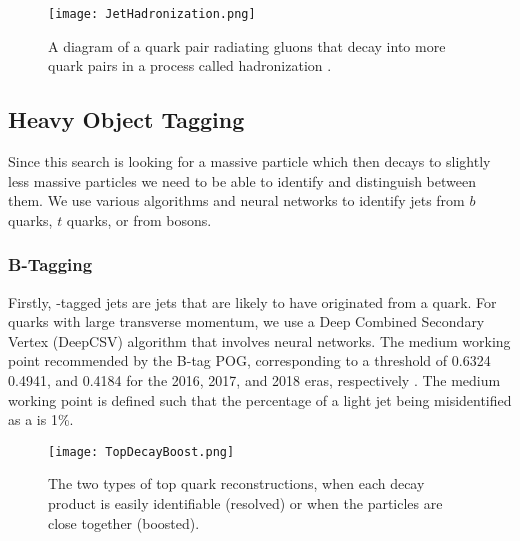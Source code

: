 \begin{figure}
 	\centering
	\texttt{[image: JetHadronization.png]}
 	\caption[Jet Hadronization]{A diagram of a quark pair radiating gluons that decay into more quark pairs in a process called hadronization \cite{griffiths_introduction_2008}.}
 	\label{JetHadronization} 
\end{figure}

\subsection{Heavy Object Tagging}\label{HeavyObject}
Since this search is looking for a massive particle which then decays to slightly less massive particles we need to be able to identify and distinguish between them. We use various algorithms and neural networks to identify jets from $b$ quarks, $t$ quarks, or from \W {} bosons. 

\subsubsection{B-Tagging}\label{Btagging}
Firstly, \B-tagged jets are jets that are likely to have originated from a \B{} quark. For \B{} quarks with large transverse momentum, we use a Deep Combined Secondary Vertex (DeepCSV) algorithm that involves neural networks\cite{noauthor_performance_nodate}. The medium working point recommended by the B-tag POG, corresponding to a threshold of 0.6324 0.4941, and 0.4184 for the 2016, 2017, and 2018 eras, respectively \cite{noauthor_https://twiki.cern.ch/twiki/bin/viewauth/cms/btagrecommendation2016legacy_nodate, noauthor_https://twiki.cern.ch/twiki/bin/viewauth/cms/btagrecommendation94x_nodate, noauthor_https://twiki.cern.ch/twiki/bin/viewauth/cms/btagrecommendation102x_nodate, noauthor_https://twiki.cern.ch/twiki/bin/viewauth/cms/btagsfmethods_nodate}. The medium working point is defined such that the percentage of a light jet being misidentified as a \bjet{} is 1\%.

\begin{figure}
 	\centering
	\texttt{[image: TopDecayBoost.png]}
 	\caption[Top Decays]{The two types of top quark reconstructions, when each decay product is easily identifiable (resolved) or when the particles are close together (boosted).}
 	\label{TopDecays} 
\end{figure}

